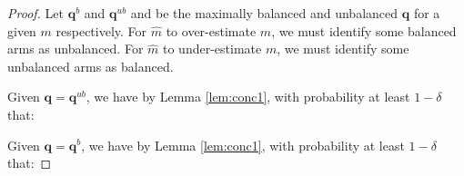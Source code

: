 \begin{proof}
Let $\boldsymbol{q}^b$ and $\boldsymbol{q}^{ub}$ and be the maximally balanced and unbalanced $\boldsymbol{q}$ for a given $m$ respectively.
For $\hat{m}$ to over-estimate $m$, we must identify some balanced arms as unbalanced. For $\hat{m}$ to under-estimate $m$, we must identify some unbalanced arms as balanced.

Given $\boldsymbol{q} = \boldsymbol{q}^{ub}$, we have by Lemma \ref{lem:conc1}, with probability at least $1 - \delta$ that: 


Given $\boldsymbol{q} = \boldsymbol{q}^{b}$, we have by Lemma \ref{lem:conc1}, with probability at least $1 - \delta$ that: 


\end{proof}

